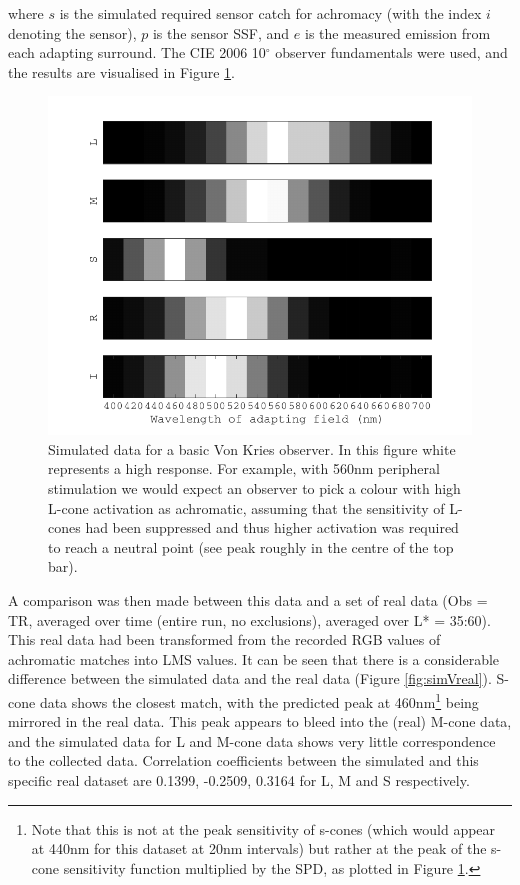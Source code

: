 where $s$ is the simulated required sensor catch for achromacy (with the index $i$ denoting the sensor), $p$ is the sensor \gls{SSF}, and $e$ is the measured emission from each adapting surround. The CIE 2006 10$^{\circ}$ observer fundamentals were used, and the results are visualised in Figure \ref{fig:LSsimdata}.

\begin{figure}[htbp]
\includegraphics[max width=\textwidth]{figs/LargeSphere/LSsimdata.pdf}
\caption{Simulated data for a basic Von Kries observer. In this figure white represents a high response. For example, with 560nm peripheral stimulation we would expect an observer to pick a colour with high L-cone activation as achromatic, assuming that the sensitivity of L-cones had been suppressed and thus higher activation was required to reach a neutral point (see peak roughly in the centre of the top bar).}
\label{fig:LSsimdata}
\end{figure}

A comparison was then made between this data and a set of real data (Obs = TR, averaged over time (entire run, no exclusions), averaged over L* = 35:60). This real data had been transformed from the recorded RGB values of achromatic matches into LMS values. It can be seen that there is a considerable difference between the simulated data and the real data (Figure \ref{fig:simVreal}). S-cone data shows the closest match, with the predicted peak at 460nm\footnote{Note that this is not at the peak sensitivity of s-cones (which would appear at 440nm for this dataset at 20nm intervals) but rather at the peak of the s-cone sensitivity function multiplied by the \gls{SPD}, as plotted in Figure \ref{fig:LSsimdata}.} being mirrored in the real data. This peak appears to bleed into the (real) M-cone data, and the simulated data for L and M-cone data shows very little correspondence to the collected data. Correlation coefficients between the simulated and this specific real dataset are 0.1399, -0.2509, 0.3164 for L, M and S respectively.


